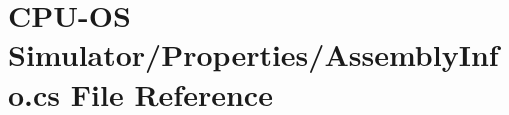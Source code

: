 \hypertarget{_c_p_u-_o_s_01_simulator_2_properties_2_assembly_info_8cs}{}\section{C\+P\+U-\/\+O\+S Simulator/\+Properties/\+Assembly\+Info.cs File Reference}
\label{_c_p_u-_o_s_01_simulator_2_properties_2_assembly_info_8cs}
